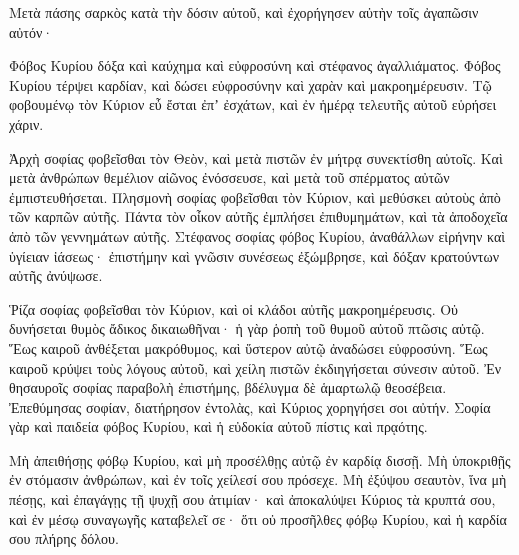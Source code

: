 {Μετὰ πάσης σαρκὸς κατὰ τὴν δόσιν αὐτοῦ, καὶ ἐχορήγησεν αὐτὴν τοῖς ἀγαπῶσιν αὐτόν·
\par }{\PP {}Φόβος Κυρίου δόξα καὶ καύχημα καὶ εὐφροσύνη καὶ στέφανος ἀγαλλιάματος.
Φόβος Κυρίου τέρψει καρδίαν, καὶ δώσει εὐφροσύνην καὶ χαρὰν καὶ μακροημέρευσιν.
Τῷ φοβουμένῳ τὸν Κύριον εὖ ἔσται ἐπʼ ἐσχάτων, καὶ ἐν ἡμέρᾳ τελευτῆς αὐτοῦ εὑρήσει χάριν.
\par }{\PP {}Ἀρχὴ σοφίας φοβεῖσθαι τὸν Θεὸν, καὶ μετὰ πιστῶν ἐν μήτρᾳ συνεκτίσθη αὐτοῖς.
Καὶ μετὰ ἀνθρώπων θεμέλιον αἰῶνος ἐνόσσευσε, καὶ μετὰ τοῦ σπέρματος αὐτῶν ἐμπιστευθήσεται.
Πλησμονὴ σοφίας φοβεῖσθαι τὸν Κύριον, καὶ μεθύσκει αὐτοὺς ἀπὸ τῶν καρπῶν αὐτῆς.
Πάντα τὸν οἶκον αὐτῆς ἐμπλήσει ἐπιθυμημάτων, καὶ τὰ ἀποδοχεῖα ἀπὸ τῶν γεννημάτων αὐτῆς.
Στέφανος σοφίας φόβος Κυρίου, ἀναθάλλων εἰρήνην καὶ ὑγίειαν ἰάσεως·
ἐπιστήμην καὶ γνῶσιν συνέσεως ἐξώμβρησε, καὶ δόξαν κρατούντων αὐτῆς ἀνύψωσε.
\par }{\PP {}Ῥίζα σοφίας φοβεῖσθαι τὸν Κύριον, καὶ οἱ κλάδοι αὐτῆς μακροημέρευσις.
Οὐ δυνήσεται θυμὸς ἄδικος δικαιωθῆναι· ἡ γὰρ ῥοπὴ τοῦ θυμοῦ αὐτοῦ πτῶσις αὐτῷ.
Ἕως καιροῦ ἀνθέξεται μακρόθυμος, καὶ ὕστερον αὐτῷ ἀναδώσει εὐφροσύνη.
Ἕως καιροῦ κρύψει τοὺς λόγους αὐτοῦ, καὶ χείλη πιστῶν ἐκδιηγήσεται σύνεσιν αὐτοῦ.
Ἐν θησαυροῖς σοφίας παραβολὴ ἐπιστήμης, βδέλυγμα δὲ ἁμαρτωλῷ θεοσέβεια.
Ἐπεθύμησας σοφίαν, διατήρησον ἐντολὰς, καὶ Κύριος χορηγήσει σοι αὐτήν.
Σοφία γὰρ καὶ παιδεία φόβος Κυρίου, καὶ ἡ εὐδοκία αὐτοῦ πίστις καὶ πρᾳότης.
\par }{\PP {}Μὴ ἀπειθήσῃς φόβῳ Κυρίου, καὶ μὴ προσέλθῃς αὐτῷ ἐν καρδίᾳ δισσῇ.
Μὴ ὑποκριθῇς ἐν στόμασιν ἀνθρώπων, καὶ ἐν τοῖς χείλεσί σου πρόσεχε.
Μὴ ἐξύψου σεαυτὸν, ἵνα μὴ πέσῃς, καὶ ἐπαγάγῃς τῇ ψυχῇ σου ἀτιμίαν· καὶ ἀποκαλύψει Κύριος τὰ κρυπτά σου, καὶ ἐν μέσῳ συναγωγῆς καταβελεῖ σε· ὅτι οὐ προσῆλθες φόβῳ Κυρίου, καὶ ἡ καρδία σου πλήρης δόλου.

}
